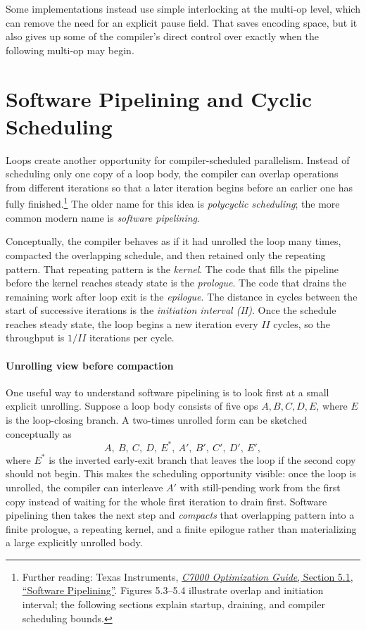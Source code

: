 Some implementations instead use simple interlocking at the multi-op level, which can remove the need for an explicit pause field.
That saves encoding space, but it also gives up some of the compiler's direct control over exactly when the following multi-op may begin.


\section{Software Pipelining and Cyclic Scheduling}\label{sec:ilp-software-pipelining}
Loops create another opportunity for compiler-scheduled parallelism.
Instead of scheduling only one copy of a loop body, the compiler can overlap operations from different iterations so that a later iteration begins before an earlier one has fully finished.\footnote{Further reading: Texas Instruments, \href{https://software-dl.ti.com/codegen/docs/c7000/optimization_guide/5_understand_opt/compopt_under_pipelining.html}{\emph{C7000 Optimization Guide}, Section 5.1, ``Software Pipelining''}. Figures 5.3--5.4 illustrate overlap and initiation interval; the following sections explain startup, draining, and compiler scheduling bounds.}
The older name for this idea is \textit{polycyclic scheduling}; the more common modern name is \textit{software pipelining}.

Conceptually, the compiler behaves as if it had unrolled the loop many times, compacted the overlapping schedule, and then retained only the repeating pattern.
That repeating pattern is the \textit{kernel}.
The code that fills the pipeline before the kernel reaches steady state is the \textit{prologue}.
The code that drains the remaining work after loop exit is the \textit{epilogue}.
The distance in cycles between the start of successive iterations is the \textit{initiation interval (II)}.
Once the schedule reaches steady state, the loop begins a new iteration every $II$ cycles, so the throughput is $1/II$ iterations per cycle.

\paragraph{Unrolling view before compaction}\label{par:ilp-swpipe-unroll-view}
One useful way to understand software pipelining is to look first at a small explicit unrolling.
Suppose a loop body consists of five ops $A,B,C,D,E$, where $E$ is the loop-closing branch.
A two-times unrolled form can be sketched conceptually as
\[
    A,\ B,\ C,\ D,\ E^\ast,\ A',\ B',\ C',\ D',\ E',
\]
where $E^\ast$ is the inverted early-exit branch that leaves the loop if the second copy should not begin.
This makes the scheduling opportunity visible: once the loop is unrolled, the compiler can interleave $A'$ with still-pending work from the first copy instead of waiting for the whole first iteration to drain first.
Software pipelining then takes the next step and \emph{compacts} that overlapping pattern into a finite prologue, a repeating kernel, and a finite epilogue rather than materializing a large explicitly unrolled body.

